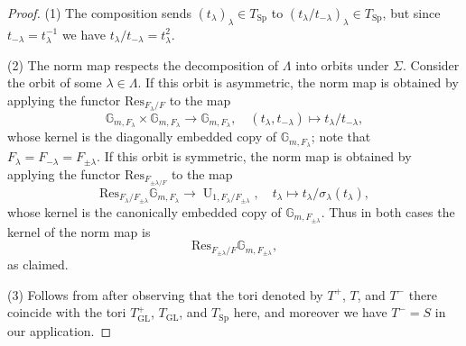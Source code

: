 \documentclass{article}
\def\mb#1{\mathbb{#1}}
\def\tx#1{\textrm{#1}}
\DeclareMathOperator{\Sp}{Sp}
\DeclareMathOperator{\GL}{GL}
\theoremstyle{definition}
\numberwithin{equation}{subsection}
\renewcommand{\-}{\hyp{}}
\DeclareMathOperator{\U}{U}
\begin{document}
\begin{proof}
	(1) The composition sends $(t_\lambda)_\lambda \in T_{\Sp}$ to $(t_\lambda/t_{-\lambda})_\lambda \in T_{\Sp}$, but since $t_{-\lambda}=t_\lambda^{-1}$ we have $t_\lambda/t_{-\lambda}=t_\lambda^2$.

	(2) The norm map respects the decomposition of $\Lambda$ into orbits under $\Sigma$. Consider the orbit of some $\lambda \in \Lambda$. If this orbit is asymmetric, the norm map is obtained by applying the functor $\tx{Res}_{F_\lambda/F}$ to the map
	\[ \mb{G}_{m,F_\lambda} \times \mb{G}_{m,F_{\lambda}} \to \mb{G}_{m,F_\lambda},\quad (t_\lambda,t_{-\lambda}) \mapsto t_\lambda/t_{-\lambda}, \]
	whose kernel is the diagonally embedded copy of $\mb{G}_{m,F_\lambda}$; note that $F_\lambda=F_{-\lambda}=F_{\pm\lambda}$. If this orbit is symmetric, the norm map is obtained by applying the functor $\tx{Res}_{F_{\pm\lambda/F}}$ to the map
	\[ \tx{Res}_{F_\lambda/F_{\pm\lambda}}\mb{G}_{m,F_\lambda} \to \U_{1,F_\lambda/F_{\pm\lambda}},\quad t_\lambda \mapsto t_\lambda/\sigma_\lambda(t_\lambda), \]
	whose kernel is the canonically embedded copy of $\mb{G}_{m,F_{\pm\lambda}}$. Thus in both cases the kernel of the norm map is 
	\[ \tx{Res}_{F_{\pm\lambda}/F}\mb{G}_{m,F_{\pm\lambda}}, \]
	as claimed.

	(3) Follows from \cite[Remark 3.1.4]{KalDC} after observing that the tori denoted by $T^+$, $T$, and $T^-$ there coincide with the tori $T_{\GL}^+$, $T_{\GL}$, and $T_{\Sp}$ here, and moreover we have $T^-=S$ in our application.



\end{proof}
\end{document}
